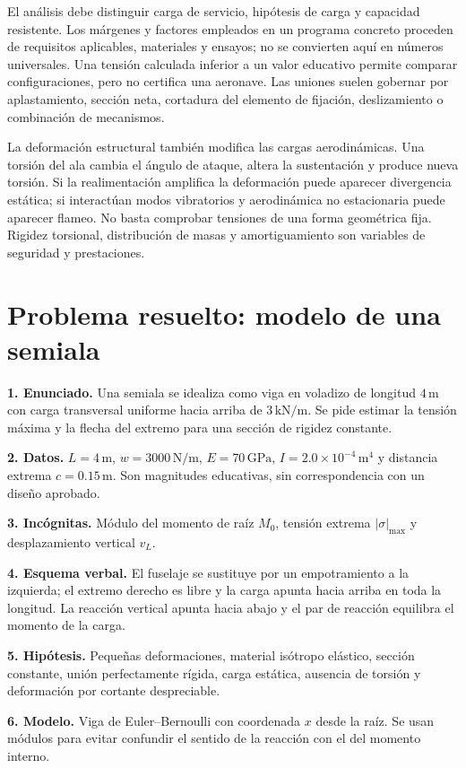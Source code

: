 El análisis debe distinguir carga de servicio, hipótesis de carga y capacidad resistente. Los márgenes y factores empleados en un programa concreto proceden de requisitos aplicables, materiales y ensayos; no se convierten aquí en números universales. Una tensión calculada inferior a un valor educativo permite comparar configuraciones, pero no certifica una aeronave. Las uniones suelen gobernar por aplastamiento, sección neta, cortadura del elemento de fijación, deslizamiento o combinación de mecanismos.

La deformación estructural también modifica las cargas aerodinámicas. Una torsión del ala cambia el ángulo de ataque, altera la sustentación y produce nueva torsión. Si la realimentación amplifica la deformación puede aparecer divergencia estática; si interactúan modos vibratorios y aerodinámica no estacionaria puede aparecer flameo. No basta comprobar tensiones de una forma geométrica fija. Rigidez torsional, distribución de masas y amortiguamiento son variables de seguridad y prestaciones.

\section{Problema resuelto: modelo de una semiala}
\textbf{1. Enunciado.} Una semiala se idealiza como viga en voladizo de longitud $4\,\mathrm{m}$ con carga transversal uniforme hacia arriba de $3\,\mathrm{kN/m}$. Se pide estimar la tensión máxima y la flecha del extremo para una sección de rigidez constante.

\textbf{2. Datos.} $L=4\,\mathrm{m}$, $w=3000\,\mathrm{N/m}$, $E=70\,\mathrm{GPa}$, $I=2.0\times10^{-4}\,\mathrm{m^4}$ y distancia extrema $c=0.15\,\mathrm{m}$. Son magnitudes educativas, sin correspondencia con un diseño aprobado.

\textbf{3. Incógnitas.} Módulo del momento de raíz $M_0$, tensión extrema $|\sigma|_{\max}$ y desplazamiento vertical $v_L$.

\textbf{4. Esquema verbal.} El fuselaje se sustituye por un empotramiento a la izquierda; el extremo derecho es libre y la carga apunta hacia arriba en toda la longitud. La reacción vertical apunta hacia abajo y el par de reacción equilibra el momento de la carga.

\textbf{5. Hipótesis.} Pequeñas deformaciones, material isótropo elástico, sección constante, unión perfectamente rígida, carga estática, ausencia de torsión y deformación por cortante despreciable.

\textbf{6. Modelo.} Viga de Euler--Bernoulli con coordenada $x$ desde la raíz. Se usan módulos para evitar confundir el sentido de la reacción con el del momento interno.

